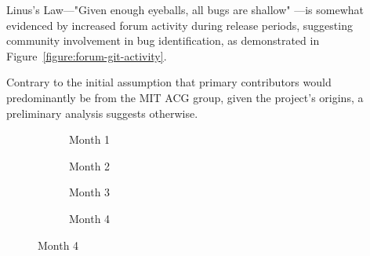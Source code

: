 \documentclass[draft]{article}
\begin{document}
Linus's Law—"Given enough eyeballs, all bugs are shallow" \parencite[29]{raymondCathedralBazaar1999}—is somewhat evidenced by increased forum activity during release periods, suggesting community involvement in bug identification, as demonstrated in Figure~\ref{figure:forum-git-activity}.



Contrary to the initial assumption that primary contributors would predominantly be from the MIT ACG group, given the project's origins, a preliminary analysis suggests otherwise.

\begin{figure}[htbp]
  \centering
  
  \begin{subfigure}[b]{0.24\textwidth}
      
      \caption{Month 1}
      \label{fig:month1}
  \end{subfigure}
  \hfill
  \begin{subfigure}[b]{0.24\textwidth}
    
      \caption{Month 2}
      \label{fig:month2}
  \end{subfigure}
  \hfill
  \begin{subfigure}[b]{0.24\textwidth}
    
      \caption{Month 3}
      \label{fig:month3}
  \end{subfigure}
  \hfill
  \begin{subfigure}[b]{0.24\textwidth}
    
      \caption{Month 4}
      \label{fig:month4}
  \end{subfigure}
  
  \vspace{0.25cm}


\end{figure}
\end{document}
